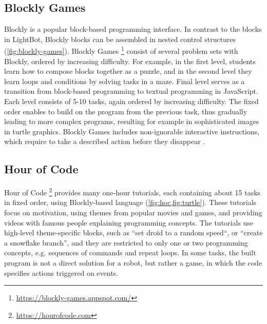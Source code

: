 \subsection{Blockly Games}
\label{sec:blockly-games}
Blockly is a popular block-based programming interface.
In contrast to the blocks in LightBot,
Blockly blocks can be assembled in nested control structures
(\cref{fig:blockly-games}).
Blockly Games%
\footnote{\url{https://blockly-games.appspot.com/}}
consist of several problem sets with Blockly, ordered by increasing difficulty.
For example, in the first level, students learn how to compose blocks together
as a puzzle, and in the second level they learn loops and conditions by solving
tasks in a maze. Final level serves as a transition from block-based
programming to textual programming in JavaScript.
Each level consists of 5-10 tasks, again ordered by increasing difficulty. %
The fixed order enables to build on the program from the previous task,
thus gradually leading to more complex programs,
resulting for example in sophisticated images in turtle graphics.
Blockly Games includes non-ignorable interactive instructions,
which require to take a described action before they disappear
\cite{blockly-10-things}.


\subsection{Hour of Code}
\label{sec:hoc}
Hour of Code%
\footnote{\url{https://hourofcode.com}}
provides many one-hour tutorials, each containing about 15 tasks in fixed order,
using Blockly-based language
(\cref{fig:hoc,fig:turtle}).
These tutorials focus on motivation, using themes from popular movies and
games, and providing videos with famous people explaining programming concepts.
The tutorials use high-level theme-specific blocks, such as ``set droid to a
random speed``, or ``create a snowflake branch'',
and they are restricted to only one or two programming
concepts, e.g. sequences of commands and repeat loops. %
In some tasks, the built program is not a direct solution for a robot,
but rather a game, in which the code specifies actions triggered on events.



